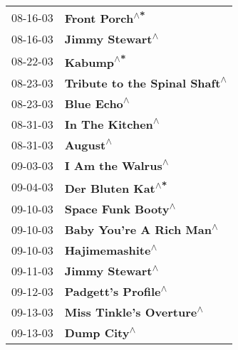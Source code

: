 \begin{supertabular}{p{0.25\columnwidth}p{0.75\columnwidth}}
 08-16-03 &                                                             \textbf{Front Porch\textsuperscript{$\wedge$*}} \\
 08-16-03 &                                                            \textbf{Jimmy Stewart\textsuperscript{$\wedge$}} \\
 08-22-03 &                                                                  \textbf{Kabump\textsuperscript{$\wedge$*}} \\
 08-23-03 &                                              \textbf{Tribute to the Spinal Shaft\textsuperscript{$\wedge$}} \\
 08-23-03 &                                                                \textbf{Blue Echo\textsuperscript{$\wedge$}} \\
 08-31-03 &                                                           \textbf{In The Kitchen\textsuperscript{$\wedge$}} \\
 08-31-03 &                                                                   \textbf{August\textsuperscript{$\wedge$}} \\
 09-03-03 &                                                          \textbf{I Am the Walrus\textsuperscript{$\wedge$}} \\
 09-04-03 &                                                          \textbf{Der Bluten Kat\textsuperscript{$\wedge$*}} \\
 09-10-03 &                                                         \textbf{Space Funk Booty\textsuperscript{$\wedge$}} \\
 09-10-03 &                                                   \textbf{Baby You're A Rich Man\textsuperscript{$\wedge$}} \\
 09-10-03 &                                                            \textbf{Hajimemashite\textsuperscript{$\wedge$}} \\
 09-11-03 &                                                            \textbf{Jimmy Stewart\textsuperscript{$\wedge$}} \\
 09-12-03 &                                                        \textbf{Padgett's Profile\textsuperscript{$\wedge$}} \\
 09-13-03 &                                                   \textbf{Miss Tinkle's Overture\textsuperscript{$\wedge$}} \\
 09-13-03 &                                                                \textbf{Dump City\textsuperscript{$\wedge$}} \\

\end{supertabular}
